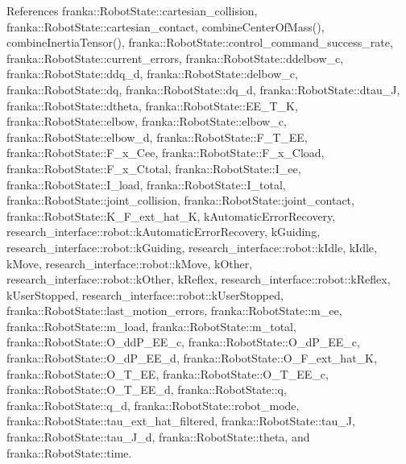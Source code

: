 References franka\+::\+Robot\+State\+::cartesian\+\_\+collision, franka\+::\+Robot\+State\+::cartesian\+\_\+contact, combine\+Center\+Of\+Mass(), combine\+Inertia\+Tensor(), franka\+::\+Robot\+State\+::control\+\_\+command\+\_\+success\+\_\+rate, franka\+::\+Robot\+State\+::current\+\_\+errors, franka\+::\+Robot\+State\+::ddelbow\+\_\+c, franka\+::\+Robot\+State\+::ddq\+\_\+d, franka\+::\+Robot\+State\+::delbow\+\_\+c, franka\+::\+Robot\+State\+::dq, franka\+::\+Robot\+State\+::dq\+\_\+d, franka\+::\+Robot\+State\+::dtau\+\_\+J, franka\+::\+Robot\+State\+::dtheta, franka\+::\+Robot\+State\+::\+E\+E\+\_\+\+T\+\_\+K, franka\+::\+Robot\+State\+::elbow, franka\+::\+Robot\+State\+::elbow\+\_\+c, franka\+::\+Robot\+State\+::elbow\+\_\+d, franka\+::\+Robot\+State\+::\+F\+\_\+\+T\+\_\+\+EE, franka\+::\+Robot\+State\+::\+F\+\_\+x\+\_\+\+Cee, franka\+::\+Robot\+State\+::\+F\+\_\+x\+\_\+\+Cload, franka\+::\+Robot\+State\+::\+F\+\_\+x\+\_\+\+Ctotal, franka\+::\+Robot\+State\+::\+I\+\_\+ee, franka\+::\+Robot\+State\+::\+I\+\_\+load, franka\+::\+Robot\+State\+::\+I\+\_\+total, franka\+::\+Robot\+State\+::joint\+\_\+collision, franka\+::\+Robot\+State\+::joint\+\_\+contact, franka\+::\+Robot\+State\+::\+K\+\_\+\+F\+\_\+ext\+\_\+hat\+\_\+K, k\+Automatic\+Error\+Recovery, research\+\_\+interface\+::robot\+::k\+Automatic\+Error\+Recovery, k\+Guiding, research\+\_\+interface\+::robot\+::k\+Guiding, research\+\_\+interface\+::robot\+::k\+Idle, k\+Idle, k\+Move, research\+\_\+interface\+::robot\+::k\+Move, k\+Other, research\+\_\+interface\+::robot\+::k\+Other, k\+Reflex, research\+\_\+interface\+::robot\+::k\+Reflex, k\+User\+Stopped, research\+\_\+interface\+::robot\+::k\+User\+Stopped, franka\+::\+Robot\+State\+::last\+\_\+motion\+\_\+errors, franka\+::\+Robot\+State\+::m\+\_\+ee, franka\+::\+Robot\+State\+::m\+\_\+load, franka\+::\+Robot\+State\+::m\+\_\+total, franka\+::\+Robot\+State\+::\+O\+\_\+dd\+P\+\_\+\+E\+E\+\_\+c, franka\+::\+Robot\+State\+::\+O\+\_\+d\+P\+\_\+\+E\+E\+\_\+c, franka\+::\+Robot\+State\+::\+O\+\_\+d\+P\+\_\+\+E\+E\+\_\+d, franka\+::\+Robot\+State\+::\+O\+\_\+\+F\+\_\+ext\+\_\+hat\+\_\+K, franka\+::\+Robot\+State\+::\+O\+\_\+\+T\+\_\+\+EE, franka\+::\+Robot\+State\+::\+O\+\_\+\+T\+\_\+\+E\+E\+\_\+c, franka\+::\+Robot\+State\+::\+O\+\_\+\+T\+\_\+\+E\+E\+\_\+d, franka\+::\+Robot\+State\+::q, franka\+::\+Robot\+State\+::q\+\_\+d, franka\+::\+Robot\+State\+::robot\+\_\+mode, franka\+::\+Robot\+State\+::tau\+\_\+ext\+\_\+hat\+\_\+filtered, franka\+::\+Robot\+State\+::tau\+\_\+J, franka\+::\+Robot\+State\+::tau\+\_\+\+J\+\_\+d, franka\+::\+Robot\+State\+::theta, and franka\+::\+Robot\+State\+::time.



